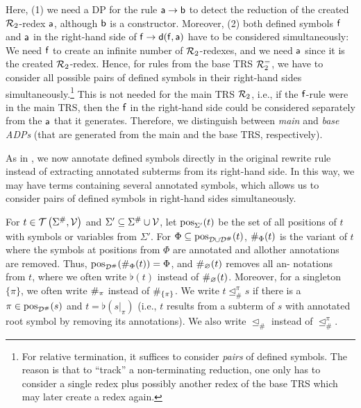   

    
Here, (1) we need a DP for
the rule $\mathsf{a} \to \mathsf{b}$ to detect the reduction of the created
$\mathcal{R}_2$-redex $\mathsf{a}$, although $\mathsf{b}$ is a constructor.
Moreover,
(2) both defined symbols $\mathsf{f}$ and $\mathsf{a}$ in the right-hand side of
$\mathsf{f} \to \mathsf{d}(\mathsf{f}, \mathsf{a})$ have to be considered simultaneously:
We need $\mathsf{f}$ to create an infinite number of $\mathcal{R}_2$-redexes, and we need $\mathsf{a}$ since it
is the created $\mathcal{R}_2$-redex.
Hence, for rules from the base TRS $\mathcal{R}_2^=$, we have to consider all possible pairs of
defined symbols in their right-hand sides simultaneously.\footnote{For relative
termination, it suffices to
consider \emph{pairs} of defined symbols.
The reason is that to ``track'' a non-terminating reduction, one only has
to
consider a single redex plus possibly another redex of the base
TRS which may later create a redex again.
}
This is not needed for the main TRS $\mathcal{R}_2$, i.e., if the $\mathsf{f}$-rule were in the
main TRS, then the $\mathsf{f}$ in the right-hand side could be considered separately from the $\mathsf{a}$ that it generates.
Therefore, we distinguish between \emph{main} and \emph{base ADPs} (that are
generated from the main and the base TRS, respectively).



As in \cite{FLOPS2024},  we now annotate defined
symbols directly in the original rewrite rule instead of extracting annotated subterms
from its right-hand side. In this way, we may have terms containing several annotated
symbols, which 
allows us to consider pairs of defined symbols in right-hand sides
simultaneously.

\begin{definition}[Annotations]
    For $t \in \mathcal{T}\left(\Sigma^\#,\mathcal{V}\right)$ 
    and $\Sigma' \subseteq \Sigma^\# \cup \mathcal{V}$, let $\mathrm{pos}_{\Sigma'}(t)$ be the
    set of all positions of $t$
    with symbols or variables from $\Sigma'$.
    For $\Phi \subseteq \mathrm{pos}_{\mathcal{D} \cup \mathcal{D}^\#}(t)$,
    $\#_\Phi(t)$ is the variant of $t$ where the symbols at positions from $\Phi$
    are annotated and all\linebreak other annotations are removed.
    Thus, $\mathrm{pos}_{\mathcal{D}^\#}(\#_\Phi(t)) = \Phi$, and
    $\#_\varnothing(t)$ removes all an-\linebreak
    notations from $t$, where we often write
    $\flat(t)$ instead of $\#_\varnothing(t)$.
    Moreover, for a singleton $\{\pi \}$, we often write $\#_\pi$ instead of $\#_{\{\pi\}}$.
   We write $t \trianglelefteq_{\#}^\pi s$ if
there is a $\pi \in \mathrm{pos}_{\mathcal{D}^\#}(s)$ and $t = \flat(s|_\pi)$
(i.e., $t$ results from  a subterm of $s$ with annotated root
symbol by removing its annotations). We also write $\trianglelefteq_{\#}$ instead of $\trianglelefteq_{\#}^\pi$.
\end{definition}

